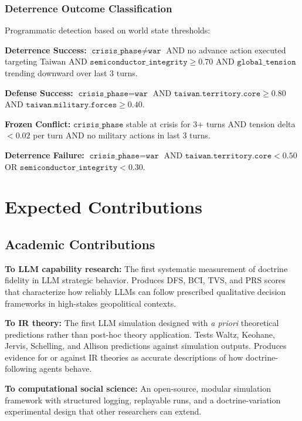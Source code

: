 \documentclass[12pt, a4paper]{article}
\begin{document}
\subsubsection{Deterrence Outcome Classification}

Programmatic detection based on world state thresholds:

\textbf{Deterrence Success:} $\texttt{crisis\_phase} \neq \texttt{war}$ AND no advance action executed targeting Taiwan AND $\texttt{semiconductor\_integrity} \geq 0.70$ AND $\texttt{global\_tension}$ trending downward over last 3 turns.

\textbf{Defense Success:} $\texttt{crisis\_phase} = \texttt{war}$ AND $\texttt{taiwan.territory.core} \geq 0.80$ AND $\texttt{taiwan.military.forces} \geq 0.40$.

\textbf{Frozen Conflict:} $\texttt{crisis\_phase}$ stable at crisis for 3+ turns AND tension delta $< 0.02$ per turn AND no military actions in last 3 turns.

\textbf{Deterrence Failure:} $\texttt{crisis\_phase} = \texttt{war}$ AND $\texttt{taiwan.territory.core} < 0.50$ OR $\texttt{semiconductor\_integrity} < 0.30$.

\section{Expected Contributions}

\subsection{Academic Contributions}

\textbf{To LLM capability research:} The first systematic measurement of doctrine fidelity in LLM strategic behavior. Produces DFS, BCI, TVS, and PRS scores that characterize how reliably LLMs can follow prescribed qualitative decision frameworks in high-stakes geopolitical contexts.

\textbf{To IR theory:} The first LLM simulation designed with \textit{a priori} theoretical predictions rather than post-hoc theory application. Tests Waltz, Keohane, Jervis, Schelling, and Allison predictions against simulation outputs. Produces evidence for or against IR theories as accurate descriptions of how doctrine-following agents behave.

\textbf{To computational social science:} An open-source, modular simulation framework with structured logging, replayable runs, and a doctrine-variation experimental design that other researchers can extend.
\end{document}
